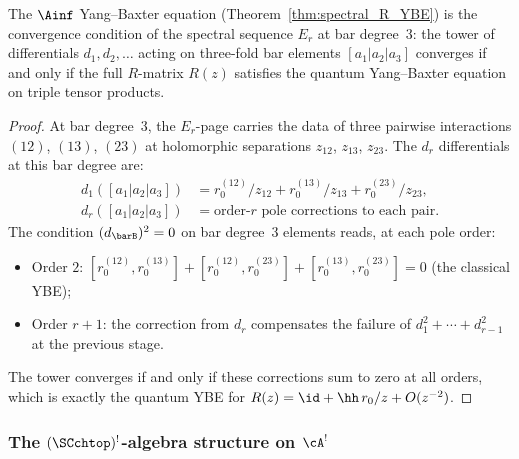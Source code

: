 \begin{corollary}
The $\Ainf$ Yang--Baxter equation
(Theorem~\ref{thm:spectral_R_YBE}) is the convergence condition
of the spectral sequence $E_r$ at bar degree~$3$: the tower of
differentials $d_1, d_2, \ldots$ acting on three-fold bar
elements $[a_1 | a_2 | a_3]$ converges if and only if the
full $R$-matrix $R(z)$ satisfies the quantum Yang--Baxter
equation on triple tensor products.
\end{corollary}

\begin{proof}
At bar degree~$3$, the $E_r$-page carries the data of three
pairwise interactions $(12)$, $(13)$, $(23)$ at holomorphic
separations $z_{12}$, $z_{13}$, $z_{23}$. The $d_r$
differentials at this bar degree are:
\begin{align*}
d_1([a_1 | a_2 | a_3])
&= r_0^{(12)}/z_{12} + r_0^{(13)}/z_{13}
 + r_0^{(23)}/z_{23}, \\
d_r([a_1 | a_2 | a_3])
&= \text{order-$r$ pole corrections to each pair}.
\end{align*}
The condition $(d_{\barB})^2 = 0$ on bar degree~$3$
elements reads, at each pole order:
\begin{itemize}
\item Order $2$: $[r_0^{(12)}, r_0^{(13)}]
 + [r_0^{(12)}, r_0^{(23)}]
 + [r_0^{(13)}, r_0^{(23)}] = 0$
 \quad (the classical YBE);
\item Order $r+1$: the correction from $d_r$ compensates
 the failure of $d_1^2 + \cdots + d_{r-1}^2$ at the previous
 stage.
\end{itemize}
The tower converges if and only if these corrections
sum to zero at all orders, which is exactly the quantum YBE
for $R(z) = \id + \hh\,r_0/z + O(z^{-2})$.
\end{proof}

\subsubsection*{The $(\SCchtop)^{!}$-algebra structure on $\cA^!$}

